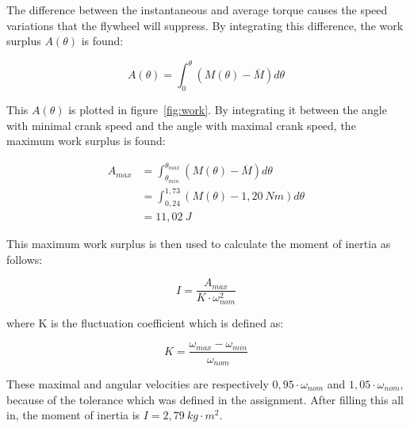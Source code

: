 \documentclass[a4paper]{article}
\begin{document}
The difference between the instantaneous and average torque causes the speed variations that the flywheel will suppress. By integrating this difference, the work surplus \(A(\theta)\) is found:

\begin{equation}
	A(\theta)=\int_{0}^{\theta}(M(\theta)-\overline{M})d\theta
\end{equation}

This \(A(\theta)\) is plotted in figure~\ref{fig:work}. By integrating it between the angle with minimal crank speed and the angle with maximal crank speed, the maximum work surplus is found:

\begin{equation}
	\begin{split}
	A_{max}&=\int_{\theta_{min}}^{\theta_{max}}(M(\theta)-\overline{M})d\theta\\
	&=\int_{0,24}^{1,73}(M(\theta)-1,20~Nm)d\theta\\
	&=11,02~J
	\end{split}
	\label{eq:amax}
\end{equation}

This maximum work surplus is then used to calculate the moment of inertia as follows:

\begin{equation}
	I = \frac{A_{max}}{K\cdot\omega_{nom}^2}
\end{equation}

where K is the fluctuation coefficient which is defined as:

\begin{equation}
	K = \frac{\omega_{max}-\omega_{min}}{\omega_{nom}}
\end{equation}

These maximal and angular velocities are respectively \(0,95\cdot\omega_{nom}\) and \(1,05\cdot\omega_{nom}\), because of the tolerance which was defined in the assignment. After filling this all in, the moment of inertia is \(I=2,79~kg\cdot m^2\).
\end{document}
